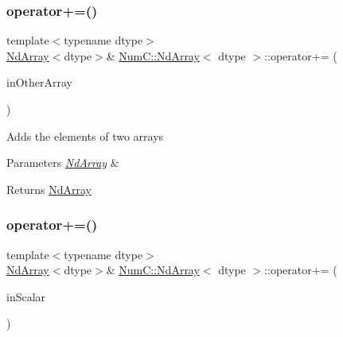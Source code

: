 \subsubsection{\texorpdfstring{operator+=()}{operator+=()}\hspace{0.1cm}{\footnotesize\ttfamily [1/2]}}
{\footnotesize\ttfamily template$<$typename dtype$>$ \\
\mbox{\hyperlink{class_num_c_1_1_nd_array}{Nd\+Array}}$<$dtype$>$\& \mbox{\hyperlink{class_num_c_1_1_nd_array}{Num\+C\+::\+Nd\+Array}}$<$ dtype $>$\+::operator+= (\begin{DoxyParamCaption}\item[{const \mbox{\hyperlink{class_num_c_1_1_nd_array}{Nd\+Array}}$<$ dtype $>$ \&}]{in\+Other\+Array }\end{DoxyParamCaption})\hspace{0.3cm}{\ttfamily [inline]}}

Adds the elements of two arrays


\begin{DoxyParams}{Parameters}
{\em \mbox{\hyperlink{class_num_c_1_1_nd_array}{Nd\+Array}}} & \\
\hline
\end{DoxyParams}
\begin{DoxyReturn}{Returns}
\mbox{\hyperlink{class_num_c_1_1_nd_array}{Nd\+Array}} 
\end{DoxyReturn}
\mbox{\label{class_num_c_1_1_nd_array_adf334fdf113d91cea91d7b8bf68b7291}} 
\subsubsection{\texorpdfstring{operator+=()}{operator+=()}\hspace{0.1cm}{\footnotesize\ttfamily [2/2]}}
{\footnotesize\ttfamily template$<$typename dtype$>$ \\
\mbox{\hyperlink{class_num_c_1_1_nd_array}{Nd\+Array}}$<$dtype$>$\& \mbox{\hyperlink{class_num_c_1_1_nd_array}{Num\+C\+::\+Nd\+Array}}$<$ dtype $>$\+::operator+= (\begin{DoxyParamCaption}\item[{dtype}]{in\+Scalar }\end{DoxyParamCaption})\hspace{0.3cm}{\ttfamily [inline]}}

